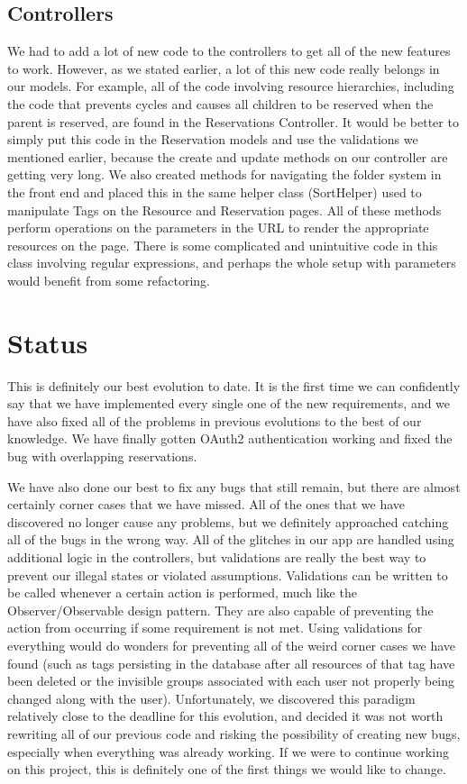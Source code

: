 \documentclass{article}
\begin{document}
\subsection{Controllers}
We had to add a lot of new code to the controllers to get all of the new features to work.  However, as we stated earlier, a lot of this new code really belongs in our models.  For example, all of the code involving resource hierarchies, including the code that prevents cycles and causes all children to be reserved when the parent is reserved, are found in the Reservations Controller.  It would be better to simply put this code in the Reservation models and use the validations we mentioned earlier, because the create and update methods on our controller are getting very long.  We also created methods for navigating the folder system in the front end and placed this in the same helper class (SortHelper) used to manipulate Tags on the Resource and Reservation pages.  All of these methods perform operations on the parameters in the URL to render the appropriate resources on the page.  There is some complicated and unintuitive code in this class involving regular expressions, and perhaps the whole setup with parameters would benefit from some refactoring.
\section{Status}
This is definitely our best evolution to date.  It is the first time we can confidently say that we have implemented every single one of the new requirements, and we have also fixed all of the problems in previous evolutions to the best of our knowledge.  We have finally gotten OAuth2 authentication working and fixed the bug with overlapping reservations.\par
We have also done our best to fix any bugs that still remain, but there are almost certainly corner cases that we have missed.  All of the ones that we have discovered no longer cause any problems, but we definitely approached catching all of the bugs in the wrong way.  All of the glitches in our app are handled using additional logic in the controllers, but validations are really the best way to prevent our illegal states or violated assumptions.  Validations can be written to be called whenever a certain action is performed, much like the Observer/Observable design pattern.  They are also capable of preventing the action from occurring if some requirement is not met.  Using validations for everything would do wonders for preventing all of the weird corner cases we have found (such as tags persisting in the database after all resources of that tag have been deleted or the invisible groups associated with each user not properly being changed along with the user).  Unfortunately, we discovered this paradigm relatively close to the deadline for this evolution, and decided it was not worth rewriting all of our previous code and risking the possibility of creating new bugs, especially when everything was already working.  If we were to continue working on this project, this is definitely one of the first things we would like to change.
\end{document}
